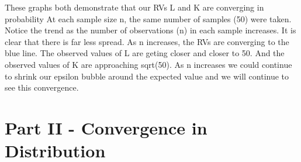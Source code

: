 \documentclass[12pt]{article}
\begin{document}
These graphs both demonstrate that our RVs L and K are converging in probability At each sample size n, the same number of samples (50) were taken.  Notice the trend as the number of observations (n) in each sample increases. It is clear that there is far less spread. As n increases, the RVs are converging to the blue line. The observed values of L are geting closer and closer to 50. And the observed values of K are approaching sqrt(50).  As n increases we could continue to shrink our epsilon bubble around the expected value and we will continue to see this convergence.


\section{Part II - Convergence in Distribution}
\end{document}
